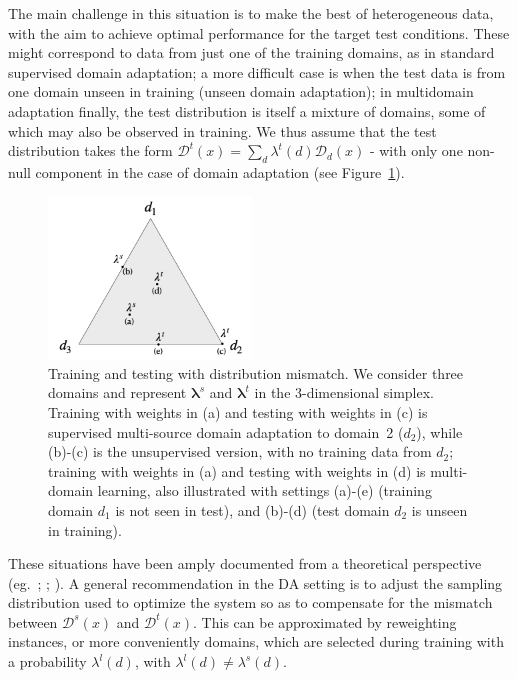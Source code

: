 \documentclass[11pt]{article}
\newcommand{\vlambda}{\ensuremath{\boldsymbol\lambda}\xspace} %
\begin{document}
The main challenge in this situation is to make the best of heterogeneous data, with the aim to achieve optimal performance for the target test conditions. These might correspond to data from just one of the training domains, as in standard supervised domain adaptation; a more difficult case is when the test data is from one domain unseen in training (unseen domain adaptation); in multidomain adaptation finally, the test distribution is itself a mixture of domains, some of which may also be observed in training. We thus assume that the test distribution takes the form $\mathcal{D}^{t}(x) = \sum_d \lambda^{t}(d) \mathcal{D}_d(x)$ - with only one non-null  component in the case of domain adaptation (see Figure~\ref{fig:mdmt-lambdas}).
\begin{figure}[h]
  \centering
  \vspace{-\baselineskip}
  \includegraphics[width=0.48\textwidth]{mdmt-lambdas}
  \caption{Training and testing with distribution mismatch. We consider three domains and represent $\vlambda^{s}$ and $\vlambda^{t}$ in the 3-dimensional simplex. Training with weights in (a) and testing with weights in (c) is supervised multi-source domain adaptation to domain~2 ($d_2$), while (b)-(c) is the unsupervised version, with no training data from $d_2$; training with weights in (a) and testing with weights in (d) is multi-domain learning, also illustrated with settings (a)-(e) (training domain $d_1$ is not seen in test), and (b)-(d)  (test domain $d_2$ is unseen in training).}\label{fig:mdmt-lambdas}
\end{figure}

These situations have been amply documented from a theoretical perspective (eg.\ ; ; ). A general recommendation in the DA setting is to adjust the sampling distribution used to optimize the system so as to compensate for the mismatch between $\mathcal{D}^s(x)$ and $\mathcal{D}^t(x)$. This can be approximated by reweighting instances, or more conveniently domains, which are selected during training with a probability $\lambda^{l}(d)$, with $\lambda^{l}(d) \neq \lambda^{s}(d)$.
\end{document}
